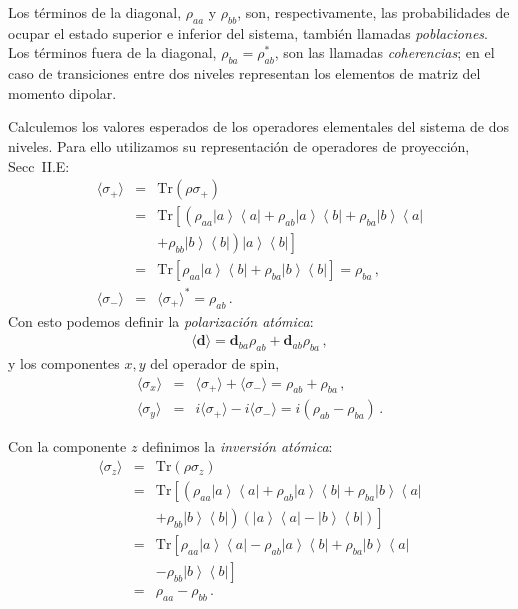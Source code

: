 \documentclass[12pt]{report}
\newcommand{\mbd}{\mathbf{d}}
\newcommand{\Tr}{\mathrm{Tr}}
\providecommand{\vxp}[1]{\langle #1 \rangle}
\newcommand{\ketbra}[2]{\left| {#1} \right\rangle\left\langle {#2}\right|}
\begin{document}
Los t\'erminos de la diagonal, $\rho_{aa}$ y $\rho_{bb}$, son, 
respectivamente, las probabilidades de ocupar el estado superior e inferior 
del sistema, tambi\'en llamadas \textit{poblaciones}. Los t\'erminos fuera de 
la diagonal, $\rho_{ba} = \rho_{ab}^{\ast}$, son las llamadas 
\textit{coherencias}; en el caso de transiciones entre dos niveles 
representan los elementos de matriz del momento dipolar.  

Calculemos los valores esperados de los operadores elementales del sistema 
de dos niveles. Para ello utilizamos su representaci\'on de operadores de 
proyecci\'on, Secc~II.E: 
%
\begin{eqnarray}
\vxp{\sigma_+} &=& \Tr ( \rho \sigma_+ ) 	\nonumber\\ 
&=& \Tr \left[ \left( \rho_{aa}  \ketbra{a}{a} 
	+  \rho_{ab}  \ketbra{a}{b}  +  \rho_{ba} \ketbra{b}{a}  
	\right. \right. 	\nonumber\\  
  && \left. \left. + \rho_{bb}  \ketbra{b}{b}  \right) \ketbra{a}{b}   
	\right] 	\nonumber 	\\ 
&=& \Tr \left[  \rho_{aa} \ketbra{a}{b}  
	+  \rho_{ba}\ketbra{b}{b} \right] 	= \rho_{ba} \,, \\ 
\vxp{\sigma_-} &=& \vxp{\sigma_+}^\ast = \rho_{ab} \,.
\end{eqnarray}
Con esto podemos definir la \textit{polarizaci\'on at\'omica}: 
%
\begin{eqnarray}
\vxp{\mbd} = \mbd_{ba} \rho_{ab} +\mbd_{ab} \rho_{ba} \,,
\end{eqnarray}
y los componentes $x,y$ del operador de spin, 
%
\begin{eqnarray}
\vxp{\sigma_x} &=& \vxp{\sigma_+} + \vxp{\sigma_-} 
	= \rho_{ab} + \rho_{ba} 	\,,	\\ 
\vxp{\sigma_y}	&=& i \vxp{\sigma_+} -i \vxp{\sigma_-} 
	= i ( \rho_{ab} - \rho_{ba} ) 	\,.
\end{eqnarray}

Con la componente $z$ definimos la \textit{inversi\'on at\'omica}: 
%
\begin{eqnarray}
\vxp{\sigma_z} &=& \Tr ( \rho \sigma_z ) 	\nonumber\\ 
&=& \Tr \left[ \left( \rho_{aa} \ketbra{a}{a} 
	+  \rho_{ab}  \ketbra{a}{b}  +  \rho_{ba} \ketbra{b}{a} 
	\right. \right. 	\nonumber\\  
  && \left. \left. + \rho_{bb} \ketbra{b}{b}  \right) 
  \left( \ketbra{a}{a} - \ketbra{b}{b} \right) 
	\right] 	\nonumber 	\\ 
&=& \Tr \left[ \rho_{aa} \ketbra{a}{a} 
	-  \rho_{ab} \ketbra{a}{b} + \rho_{ba} \ketbra{b}{a} \right. \nonumber \\
	 && \left. - \rho_{bb} \ketbra{b}{b}  \right] 	\nonumber \\ 
&=& \rho_{aa} - \rho_{bb} 	\,.
\end{eqnarray}
 
\end{document}
